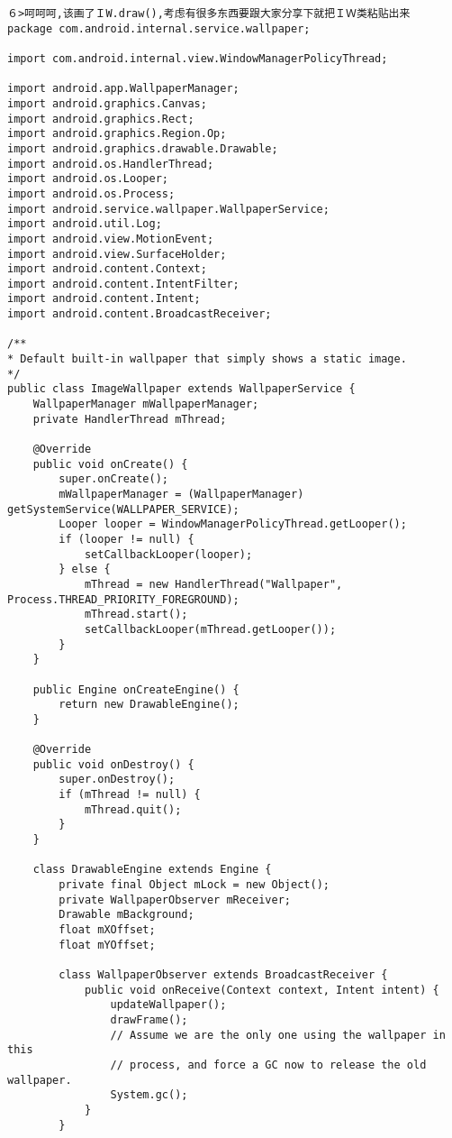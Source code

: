 \documentclass[a4paper,11pt,twoside,openany]{article}%
\begin{document}
\begin{CJK}{UTF8}{song}
\begin{verbatim}
６>呵呵呵,该画了ＩW.draw(),考虑有很多东西要跟大家分享下就把ＩＷ类粘贴出来 
package com.android.internal.service.wallpaper; 

import com.android.internal.view.WindowManagerPolicyThread; 

import android.app.WallpaperManager; 
import android.graphics.Canvas; 
import android.graphics.Rect; 
import android.graphics.Region.Op; 
import android.graphics.drawable.Drawable; 
import android.os.HandlerThread; 
import android.os.Looper; 
import android.os.Process; 
import android.service.wallpaper.WallpaperService; 
import android.util.Log; 
import android.view.MotionEvent; 
import android.view.SurfaceHolder; 
import android.content.Context; 
import android.content.IntentFilter; 
import android.content.Intent; 
import android.content.BroadcastReceiver; 

/** 
* Default built-in wallpaper that simply shows a static image. 
*/ 
public class ImageWallpaper extends WallpaperService { 
    WallpaperManager mWallpaperManager; 
    private HandlerThread mThread; 

    @Override 
    public void onCreate() { 
        super.onCreate(); 
        mWallpaperManager = (WallpaperManager) getSystemService(WALLPAPER_SERVICE); 
        Looper looper = WindowManagerPolicyThread.getLooper(); 
        if (looper != null) { 
            setCallbackLooper(looper); 
        } else { 
            mThread = new HandlerThread("Wallpaper", Process.THREAD_PRIORITY_FOREGROUND); 
            mThread.start(); 
            setCallbackLooper(mThread.getLooper()); 
        } 
    } 

    public Engine onCreateEngine() { 
        return new DrawableEngine(); 
    } 

    @Override 
    public void onDestroy() { 
        super.onDestroy(); 
        if (mThread != null) { 
            mThread.quit(); 
        } 
    } 

    class DrawableEngine extends Engine { 
        private final Object mLock = new Object(); 
        private WallpaperObserver mReceiver; 
        Drawable mBackground; 
        float mXOffset; 
        float mYOffset; 

        class WallpaperObserver extends BroadcastReceiver { 
            public void onReceive(Context context, Intent intent) { 
                updateWallpaper(); 
                drawFrame(); 
                // Assume we are the only one using the wallpaper in this 
                // process, and force a GC now to release the old wallpaper. 
                System.gc(); 
            } 
        } 


\end{verbatim}
\end{CJK}
\end{document}

